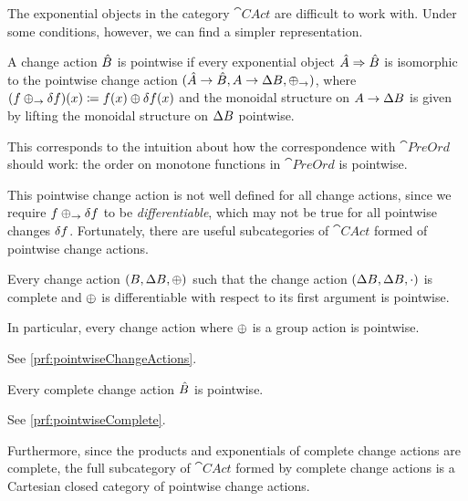 The exponential objects in the category $\cat{CAct}$ are difficult to work with. Under some
conditions, however, we can find a simpler representation.

\begin{defn}
  \label{def:pointwiseChanges}
  A change action $\hat{B}$ is pointwise if every exponential object
  ${\hat{A}} \Rightarrow {\hat{B}}$ is isomorphic to the pointwise change action
  $(\hat{A} \rightarrow \hat{B},A \rightarrow \Delta B,\oplus_\rightarrow)$,
  where $(f \oplus_\rightarrow \delta f)(x) \coloneqq f(x) \oplus \delta f(x)$ and the
  monoidal structure on $A \rightarrow \Delta B$ is given by lifting
  the monoidal structure on $\Delta B$ pointwise.
\end{defn}

This corresponds to the intuition about how the correspondence with
$\cat{PreOrd}$ should work: the order on monotone functions in $\cat{PreOrd}$ is
pointwise.

This pointwise change action is not well defined for all change actions, since
we require $f \oplus_\rightarrow \delta f$ to be \emph{differentiable}, which
may not be true for all pointwise changes $\delta f$.
Fortunately, there are useful subcategories of $\cat{CAct}$ formed of pointwise change actions.

\begin{prop}[name=Pointwise change actions, restate=pointwiseChangeActions]
  \label{prop:pointwiseChangeActions}
  Every change action $(B,\Delta B,\oplus)$ such that the change action
  $(\Delta B,\Delta B,\cdot)$ is complete and $\oplus$ is differentiable with
  respect to its first argument is pointwise.

  In particular, every change action where $\oplus$ is a group action is pointwise.
\end{prop}
\ifproofs
  See \cref{prf:pointwiseChangeActions}.
\fi

\begin{prop}[name=Complete implies pointwise, restate=pointwiseComplete]
  \label{prop:pointwiseComplete}
   Every complete change action $\hat{B}$ is pointwise.
\end{prop}
\ifproofs
  See \cref{prf:pointwiseComplete}.
\fi

Furthermore, since the products and exponentials of complete change actions are complete,
the full subcategory of $\cat{CAct}$ formed by complete change actions is a Cartesian
closed category of pointwise change actions.

